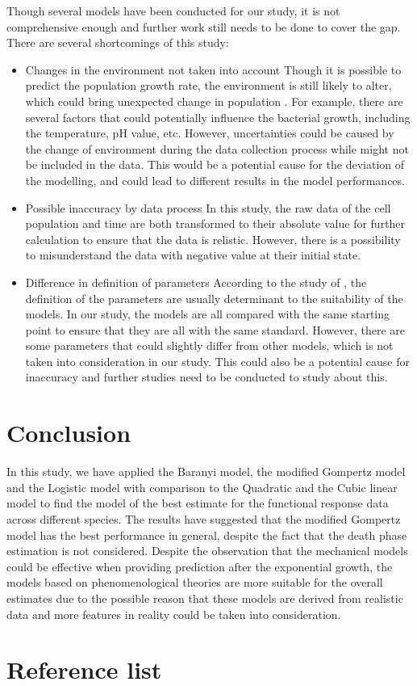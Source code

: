 \documentclass[11pt, oneside]{article}
\begin{document}
	Though several models have been conducted for our study, it is not comprehensive enough and further work still needs to be done to cover the gap. There are several shortcomings of this study:
	\begin{itemize}
	\item Changes in the environment not taken into account
	\bigbreak
	\noindent Though it is possible to predict the population growth rate, the environment is still likely to alter, which could bring unexpected change in population \cite{Sutherland and Norris}. For example, there are several factors that could potentially influence the bacterial growth, including the temperature, pH value, etc. \cite{Gale} However, uncertainties could be caused by the change of environment during the data collection process while might not be included in the data. This would be a potential cause for the deviation of the modelling, and could lead to different results in the model performances.
	\item Possible inaccuracy by data process
	\bigbreak 
	\noindent In this study, the raw data of the cell population and time are both transformed to their absolute value for further calculation to ensure that the data is relistic. However, there is a possibility to misunderstand the data with negative value at their initial state.
	\bigbreak
	\item Difference in definition of parameters
	\noindent According to the study of \cite{Perni}, the definition of the parameters are usually determinant to the suitability of the models. In our study, the models are all compared with the same starting point to ensure that they are all with the same standard. However, there are some parameters that could slightly differ from other models, which is not taken into consideration in our study. This could also be a potential cause for inaccuracy and further studies need to be conducted to study about this.
	\end{itemize}
	
	\section{Conclusion}
	
	In this study, we have applied the Baranyi model, the modified Gompertz model and the Logistic model with comparison to the Quadratic and the Cubic linear model to find the model of the best estimate for the functional response data across different species. The results have suggested that the modified Gompertz model has the best performance in general, despite the fact that the death phase estimation is not considered. Despite the observation that the mechanical models could be effective when providing prediction after the exponential growth, the models based on phenomenological theories are more suitable for the overall estimates due to the possible reason that these models are derived from realistic data and more features in reality could be taken into consideration. 
	\pagebreak
	\section{Reference list}


\end{document}
